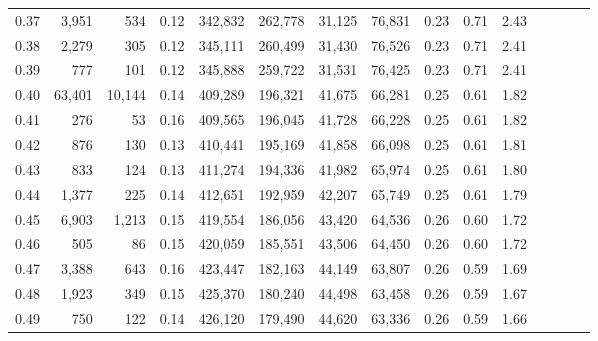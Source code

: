 \begin{tabular}{rrrcrrrrrrrrrrr}
0.37 &   3,951 &     534 &                                       0.12 &  342,832 &  262,778 &   31,125 &   76,831 &  0.23 &  0.71 &                         2.43 \\
0.38 &   2,279 &     305 &                                       0.12 &  345,111 &  260,499 &   31,430 &   76,526 &  0.23 &  0.71 &                         2.41 \\
0.39 &     777 &     101 &                                       0.12 &  345,888 &  259,722 &   31,531 &   76,425 &  0.23 &  0.71 &                         2.41 \\
0.40 &  63,401 &  10,144 &                                       0.14 &  409,289 &  196,321 &   41,675 &   66,281 &  0.25 &  0.61 &                         1.82 \\
0.41 &     276 &      53 &                                       0.16 &  409,565 &  196,045 &   41,728 &   66,228 &  0.25 &  0.61 &                         1.82 \\
0.42 &     876 &     130 &                                       0.13 &  410,441 &  195,169 &   41,858 &   66,098 &  0.25 &  0.61 &                         1.81 \\
0.43 &     833 &     124 &                                       0.13 &  411,274 &  194,336 &   41,982 &   65,974 &  0.25 &  0.61 &                         1.80 \\
0.44 &   1,377 &     225 &                                       0.14 &  412,651 &  192,959 &   42,207 &   65,749 &  0.25 &  0.61 &                         1.79 \\
0.45 &   6,903 &   1,213 &                                       0.15 &  419,554 &  186,056 &   43,420 &   64,536 &  0.26 &  0.60 &                         1.72 \\
0.46 &     505 &      86 &                                       0.15 &  420,059 &  185,551 &   43,506 &   64,450 &  0.26 &  0.60 &                         1.72 \\
0.47 &   3,388 &     643 &                                       0.16 &  423,447 &  182,163 &   44,149 &   63,807 &  0.26 &  0.59 &                         1.69 \\
0.48 &   1,923 &     349 &                                       0.15 &  425,370 &  180,240 &   44,498 &   63,458 &  0.26 &  0.59 &                         1.67 \\
0.49 &     750 &     122 &                                       0.14 &  426,120 &  179,490 &   44,620 &   63,336 &  0.26 &  0.59 &                         1.66 \\

\end{tabular}
